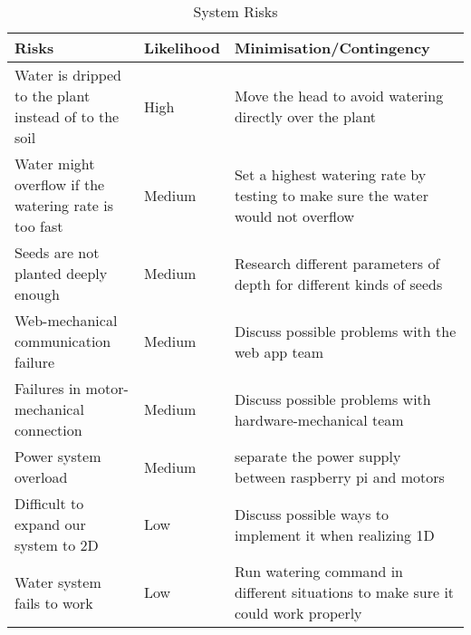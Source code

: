 \begin{table}[H]
\begin{tabular}{ |p{2cm}|p{1.6cm}|p{3.8cm}|  }
 \hline
 \textbf{Risks}& \textbf{Likelihood}& \textbf{Minimisation/Contingency}\\
 \hline
 Water is dripped to the plant instead of to the soil& High& Move the head to avoid watering directly over the plant\\
 \hline
 Water might overflow if the watering rate is too fast& Medium& Set a highest watering rate by testing to make sure the water would not overflow\\
 \hline
 Seeds are not planted deeply enough& Medium& Research different parameters of depth for different kinds of seeds\\
 \hline
 Web-mechanical communication failure& Medium & 
Discuss possible problems with the web app team \\
 \hline
 Failures in motor-mechanical connection & Medium & Discuss possible problems with hardware-mechanical team \\
 \hline
 Power system overload & Medium & separate the power supply between  raspberry pi and motors \\
 \hline
 Difficult to expand our system to 2D & Low & Discuss possible ways to implement it when realizing 1D  \\
 \hline
 Water system fails to work &Low &Run watering command in different situations to make sure it could work properly\\
 \hline
\end{tabular}

\vspace*{-3mm}
\caption{System Risks}
\vspace{-15mm}
\label{tab:systemrisk}
\end{table}
